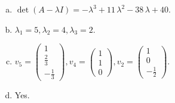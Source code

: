 \begin{questions}
\begin{solution}
\begin{enumerate}[(a)]
\item $\det(A-\lambda I)=-{\lambda}^{3} + 11 \, {\lambda}^{2} - 38 \, {\lambda} + 40$.
\item ${\lambda}_1=5, {\lambda}_2=4, {\lambda}_3=2$.
\item $v_{5}=\left(\begin{array}{r}
1 \\
\frac{2}{3} \\
-\frac{1}{3}
\end{array}\right), v_{4}=\left(\begin{array}{r}
1 \\
1 \\
0
\end{array}\right), v_{2}=\left(\begin{array}{r}
1 \\
0 \\
-\frac{1}{2}
\end{array}\right)$.
\item Yes.
\end{enumerate}
\end{solution}

\end{questions}

\newpage


\begin{center}
\end{center}

